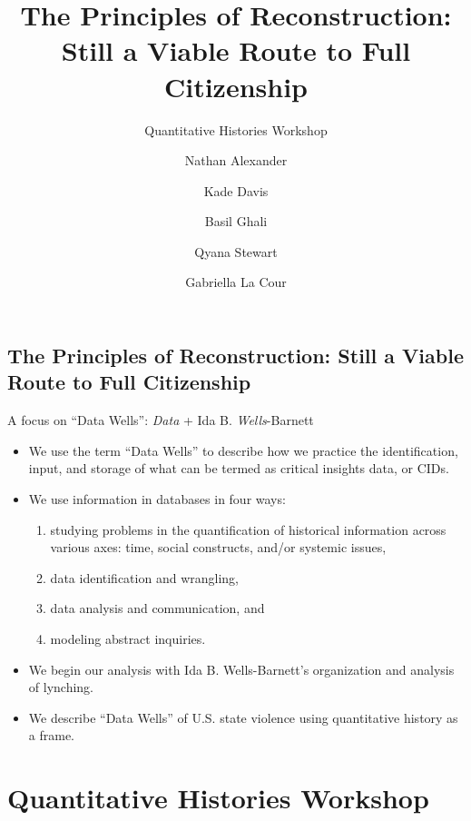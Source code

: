 \documentclass[
  letterpaper,
  DIV=11,
  numbers=noendperiod]{scrartcl}
\title{The Principles of Reconstruction: Still a Viable Route to Full
Citizenship}
\subtitle{Quantitative Histories Workshop}
\author{Nathan Alexander \and Kade Davis \and Basil Ghali \and Qyana
Stewart \and Gabriella La Cour}
\date{}
\renewcommand*\contentsname{Table of contents}
\newcommand\contentsname{Table of contents}
\begin{document}
\maketitle
\ifdefined\Shaded\renewenvironment{Shaded}{\begin{tcolorbox}[borderline west={3pt}{0pt}{shadecolor}, breakable, enhanced, boxrule=0pt, interior hidden, frame hidden, sharp corners]}{\end{tcolorbox}}\fi

\renewcommand*\contentsname{Table of contents}
{
\hypersetup{linkcolor=}
\setcounter{tocdepth}{3}
\tableofcontents
}
\hypertarget{the-principles-of-reconstruction-still-a-viable-route-to-full-citizenship}{%
\subsection{The Principles of Reconstruction: Still a Viable Route to
Full
Citizenship}\label{the-principles-of-reconstruction-still-a-viable-route-to-full-citizenship}}

A focus on ``Data Wells'': {\emph{Data}} + Ida B. {\emph{Wells}}-Barnett

\begin{itemize}
\item
  We use the term ``{Data Wells}'' to describe how we practice the
  identification, input, and storage of what can be termed as critical
  insights data, or CIDs.
\item
  We use information in databases in four ways:

  \begin{enumerate}
  \def\labelenumi{(\arabic{enumi})}
  \item
    studying problems in the {quantification of historical information}
    across various axes: time, social constructs, and/or systemic
    issues,
  \item
    data {identification} and {wrangling},
  \item
    data {analysis} and {communication}, and
  \item
    {modeling} abstract inquiries.
  \end{enumerate}
\item
  We begin our analysis with Ida B. Wells-Barnett's organization and
  analysis of lynching.
\item
  We describe ``Data Wells'' of U.S. state violence using quantitative
  history as a frame.
\end{itemize}

\hypertarget{quantitative-histories-workshop}{%
\section{Quantitative Histories
Workshop}\label{quantitative-histories-workshop}}
\end{document}
